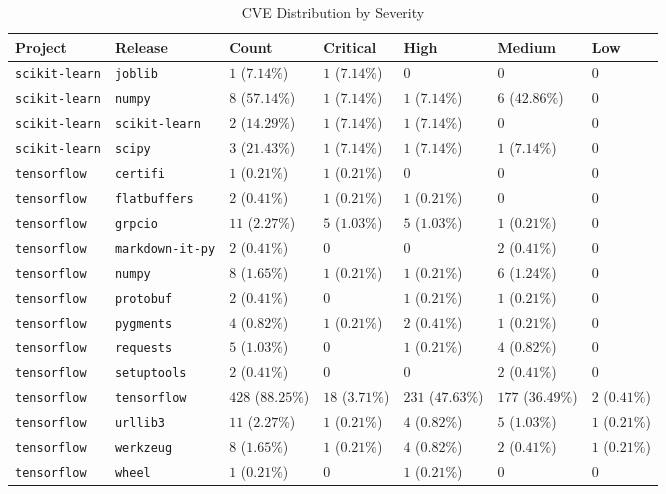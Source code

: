 \begin{table}
\caption{CVE Distribution by Severity}
\label{tab:cve-distribution}
\begin{tabular}{lllllll}
\toprule
Project & Release & Count & Critical & High & Medium & Low \\
\midrule
\texttt{scikit-learn} & \texttt{joblib} & $1$ ($7.14\%$) & $1$ ($7.14\%$) & $0$ & $0$ & $0$ \\
\texttt{scikit-learn} & \texttt{numpy} & $8$ ($57.14\%$) & $1$ ($7.14\%$) & $1$ ($7.14\%$) & $6$ ($42.86\%$) & $0$ \\
\texttt{scikit-learn} & \texttt{scikit-learn} & $2$ ($14.29\%$) & $1$ ($7.14\%$) & $1$ ($7.14\%$) & $0$ & $0$ \\
\texttt{scikit-learn} & \texttt{scipy} & $3$ ($21.43\%$) & $1$ ($7.14\%$) & $1$ ($7.14\%$) & $1$ ($7.14\%$) & $0$ \\
\texttt{tensorflow} & \texttt{certifi} & $1$ ($0.21\%$) & $1$ ($0.21\%$) & $0$ & $0$ & $0$ \\
\texttt{tensorflow} & \texttt{flatbuffers} & $2$ ($0.41\%$) & $1$ ($0.21\%$) & $1$ ($0.21\%$) & $0$ & $0$ \\
\texttt{tensorflow} & \texttt{grpcio} & $11$ ($2.27\%$) & $5$ ($1.03\%$) & $5$ ($1.03\%$) & $1$ ($0.21\%$) & $0$ \\
\texttt{tensorflow} & \texttt{markdown-it-py} & $2$ ($0.41\%$) & $0$ & $0$ & $2$ ($0.41\%$) & $0$ \\
\texttt{tensorflow} & \texttt{numpy} & $8$ ($1.65\%$) & $1$ ($0.21\%$) & $1$ ($0.21\%$) & $6$ ($1.24\%$) & $0$ \\
\texttt{tensorflow} & \texttt{protobuf} & $2$ ($0.41\%$) & $0$ & $1$ ($0.21\%$) & $1$ ($0.21\%$) & $0$ \\
\texttt{tensorflow} & \texttt{pygments} & $4$ ($0.82\%$) & $1$ ($0.21\%$) & $2$ ($0.41\%$) & $1$ ($0.21\%$) & $0$ \\
\texttt{tensorflow} & \texttt{requests} & $5$ ($1.03\%$) & $0$ & $1$ ($0.21\%$) & $4$ ($0.82\%$) & $0$ \\
\texttt{tensorflow} & \texttt{setuptools} & $2$ ($0.41\%$) & $0$ & $0$ & $2$ ($0.41\%$) & $0$ \\
\texttt{tensorflow} & \texttt{tensorflow} & $428$ ($88.25\%$) & $18$ ($3.71\%$) & $231$ ($47.63\%$) & $177$ ($36.49\%$) & $2$ ($0.41\%$) \\
\texttt{tensorflow} & \texttt{urllib3} & $11$ ($2.27\%$) & $1$ ($0.21\%$) & $4$ ($0.82\%$) & $5$ ($1.03\%$) & $1$ ($0.21\%$) \\
\texttt{tensorflow} & \texttt{werkzeug} & $8$ ($1.65\%$) & $1$ ($0.21\%$) & $4$ ($0.82\%$) & $2$ ($0.41\%$) & $1$ ($0.21\%$) \\
\texttt{tensorflow} & \texttt{wheel} & $1$ ($0.21\%$) & $0$ & $1$ ($0.21\%$) & $0$ & $0$ \\
\bottomrule
\end{tabular}
\end{table}
